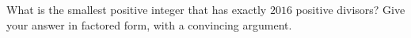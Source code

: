 What is the smallest positive integer that has exactly $2016$ positive divisors? Give your answer in factored form, with a convincing argument.
